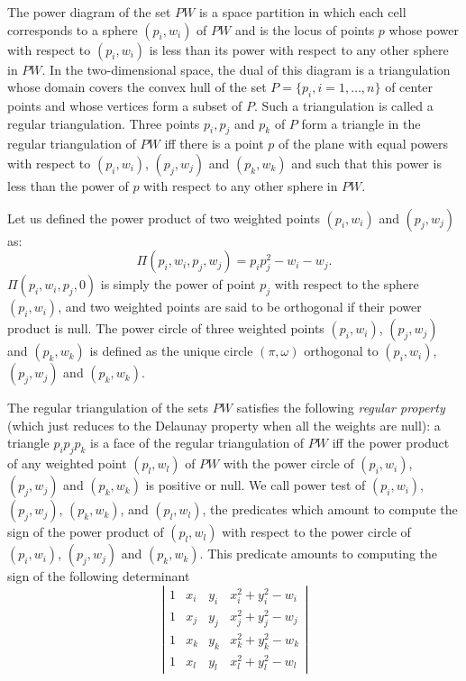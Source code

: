 The power diagram of the set ${  PW}$ is a space partition in which
 each cell corresponds to a sphere $(p_i, w_i)$ of ${  PW}$
and is the locus of points  $p$ whose power with respect to $(p_i, w_i)$
is less than its power with respect to any other sphere 
in ${  PW}$. In the two-dimensional space,
the dual of this diagram is a triangulation 
whose domain covers the convex hull of the set 
${  P}= \{ p_i, i = 1, \ldots , n \}$ of center points
and whose vertices form a subset of ${  P}$.
Such a triangulation is called a regular triangulation.
Three points $p_i, p_j$ and $p_k$ of ${  P}$
form a triangle in the regular triangulation of ${  PW}$
iff there is a point $p$ of the plane with equal 
powers with respect to $(p_i, w_i)$, $(p_j, w_j)$
and $(p_k, w_k)$ and such that this power 
is  less than the power of $p$
with respect to any other sphere in  ${  PW}$.

Let us defined the power product of two weighted points
$(p_i, w_i)$ and $(p_j, w_j)$ as:
\[\Pi(p_i, w_i,p_j, w_j) = p_ip_j ^2 - w_i  - w_j  .\]
$\Pi(p_i, w_i,p_j, 0)$ is simply the power of point $p_j$
with respect to the sphere $(p_i, w_i)$, and two weighted points 
are said to be orthogonal if their power product is null.
The power circle of three weighted points
 $(p_i, w_i)$, $(p_j, w_j)$
and $(p_k, w_k)$ is defined as the unique circle
$(\pi, \omega)$  orthogonal to
 $(p_i, w_i)$, $(p_j, w_j)$
and $(p_k, w_k)$.

The regular triangulation of the sets ${  PW}$
satisfies the following {\em regular property} (which just reduces to the 
Delaunay property when all the weights are null):
a triangle $p_ip_jp_k$ is a face of the regular triangulation
of ${  PW}$ iff the power product of any weighted point
 $(p_l, w_l)$ of ${  PW}$ with the power circle of
 $(p_i, w_i)$, $(p_j, w_j)$ and $(p_k, w_k)$ is positive or null.
We call  power test of  $(p_i, w_i)$, $(p_j, w_j)$, $(p_k, w_k)$,
and $(p_l, w_l)$,  the predicates which amount to compute
the sign of 
the power product of $(p_l, w_l)$ with respect to
the power circle of
 $(p_i, w_i)$, $(p_j, w_j)$ and $(p_k, w_k)$.
This predicate amounts to computing the sign of
the following
determinant
\[\left| \begin{array}{cccc}
1  &  x_i  &  y_i  &  x_i ^2 + y_i ^2 - w_i  \\
1  &  x_j  &  y_j  &  x_j ^2 + y_j ^2 - w_j  \\
1  &  x_k  &  y_k  &  x_k ^2 + y_k ^2 - w_k  \\
1  &  x_l  &  y_l  &  x_l ^2 + y_l ^2 - w_l
\end{array}
\right|
\]

